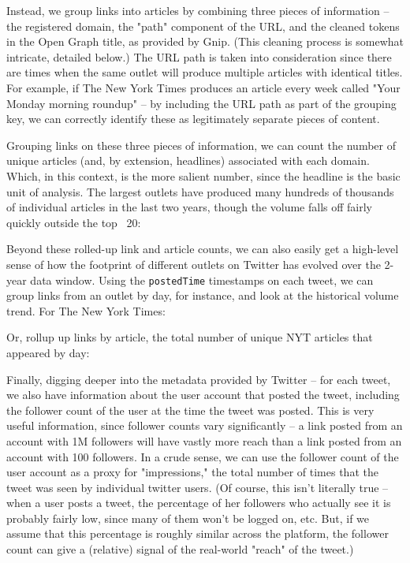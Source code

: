 \documentclass{scrartcl}
\begin{document}
Instead, we group links into articles by combining three pieces of information -- the registered domain, the "path" component of the URL, and the cleaned tokens in the Open Graph title, as provided by Gnip. (This cleaning process is somewhat intricate, detailed below.) The URL path is taken into consideration since there are times when the same outlet will produce multiple articles with identical titles. For example, if The New York Times produces an article every week called "Your Monday morning roundup" -- by including the URL path as part of the grouping key, we can correctly identify these as legitimately separate pieces of content.

Grouping links on these three pieces of information, we can count the number of unique articles (and, by extension, headlines) associated with each domain. Which, in this context, is the more salient number, since the headline is the basic unit of analysis. The largest outlets have produced many hundreds of thousands of individual articles in the last two years, though the volume falls off fairly quickly outside the top ~20:


Beyond these rolled-up link and article counts, we can also easily get a high-level sense of how the footprint of different outlets on Twitter has evolved over the 2-year data window. Using the \texttt{postedTime} timestamps on each tweet, we can group links from an outlet by day, for instance, and look at the historical volume trend. For The New York Times:


Or, rollup up links by article, the total number of unique NYT articles that appeared by day:


Finally, digging deeper into the metadata provided by Twitter -- for each tweet, we also have information about the user account that posted the tweet, including the follower count of the user at the time the tweet was posted. This is very useful information, since follower counts vary significantly -- a link posted from an account with 1M followers will have vastly more reach than a link posted from an account with 100 followers. In a crude sense, we can use the follower count of the user account as a proxy for "impressions," the total number of times that the tweet was seen by individual twitter users. (Of course, this isn't literally true -- when a user posts a tweet, the percentage of her followers who actually see it is probably fairly low, since many of them won't be logged on, etc. But, if we assume that this percentage is roughly similar across the platform, the follower count can give a (relative) signal of the real-world "reach" of the tweet.)
\end{document}
